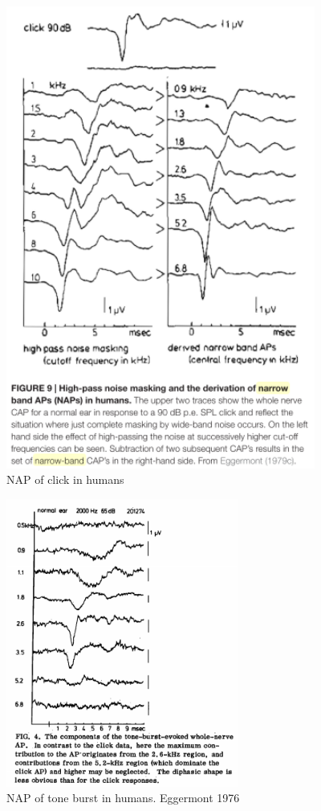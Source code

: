 \documentclass[]{article}
\begin{document}
\begin{figure}
\centering
\includegraphics[width=4in,height=\textheight]{./figures/NAP_click.png}
\caption{NAP of click in humans}
\end{figure}

\begin{figure}
\centering
\includegraphics[width=3in,height=\textheight]{./figures/NAP_tone.png}
\caption{NAP of tone burst in humans. Eggermont 1976}
\end{figure}
\end{document}
